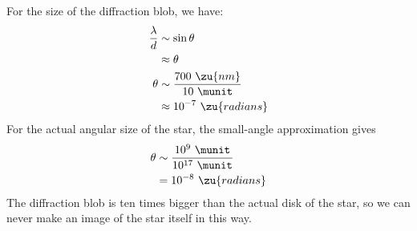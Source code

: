 For the size of the diffraction blob, we have:
\begin{align*}
  \frac{\lambda}{d} &\sim \sin\theta \\
  	&\approx \theta \\
  \theta &\sim \frac{700\ \zu{nm}}{10\ \munit} \\
	&\approx 10^{-7}\ \zu{radians}
\end{align*}
For the actual angular size of the star, the small-angle approximation gives
\begin{align*}
  \theta &\sim \frac{10^9\ \munit}{10^{17}\ \munit} \\
	&= 10^{-8}\ \zu{radians}
\end{align*}
The diffraction blob is ten times bigger than the actual disk of the
star, so we can never make an image of the star itself in this way.
